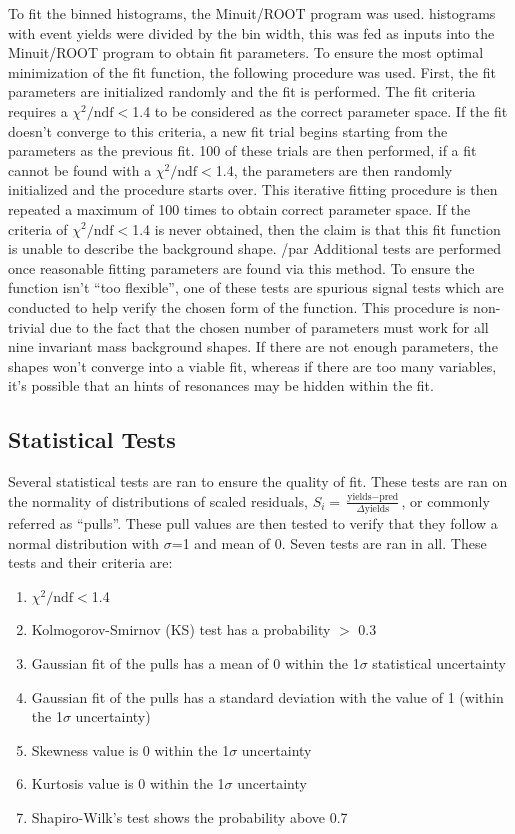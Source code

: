To fit the binned histograms, the Minuit/ROOT program was used. histograms with event yields were divided by the bin width, this was fed as inputs into the Minuit/ROOT program to obtain fit parameters. 
To ensure the most optimal minimization of the fit function, the following procedure was used. First, the fit parameters are initialized randomly and the fit is performed. The fit criteria requires a $\chi^{\textrm{2}}/\textrm{ndf}<$1.4
to be considered as the correct parameter space. If the fit doesn't converge to this criteria, a new fit trial begins starting from the parameters as the previous fit. 100 of these trials are then performed, if a 
fit cannot be found with a $\chi^{\textrm{2}}/\textrm{ndf}<$1.4, the parameters are then randomly initialized and the procedure starts over. This iterative fitting procedure is then repeated a maximum of 100 times
to obtain correct parameter space. If the criteria of $\chi^{\textrm{2}}/\textrm{ndf}<$1.4 is never obtained, then the claim is that this fit function is unable to describe the background shape.
/par
Additional tests are performed once reasonable fitting parameters are found via this method. To ensure the function isn't ``too flexible'', one of these tests are spurious signal tests which are 
conducted to help verify the chosen form of the function. This procedure is non-trivial due to the fact that the chosen number of parameters must work for all nine invariant mass background shapes. If there 
are not enough parameters, the shapes won't converge into a viable fit, whereas if there are too many variables, it's possible that an hints of resonances may be hidden within the fit. 

\subsection{Statistical Tests}

Several statistical tests are ran to ensure the quality of fit. These tests are ran on the normality of distributions of scaled residuals, $S_i = \frac{\text{yields} - \text{pred}}{\Delta \text{yields}}$, or commonly 
referred as ``pulls''. These pull values are then tested to verify that they follow a normal distribution with $\sigma$=1 and mean of 0. Seven tests are ran in all. These tests and their criteria are:

\begin{enumerate}
    \item $\chi^{\textrm{2}}/\textrm{ndf}<$1.4
    \item Kolmogorov-Smirnov (KS) test has a probability $>$ 0.3
    \item Gaussian fit of the pulls has a mean of 0 within the  1$\sigma$ statistical uncertainty
    \item Gaussian fit of the pulls has a standard deviation with the value of 1 (within the 1$\sigma$ uncertainty)
    \item Skewness value is 0 within the 1$\sigma$ uncertainty
    \item Kurtosis value is 0 within the 1$\sigma$ uncertainty
    \item Shapiro-Wilk's test shows the probability above 0.7
\end{enumerate}

